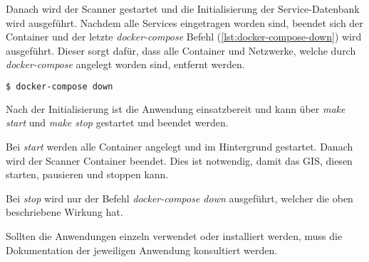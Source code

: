 Danach wird der Scanner gestartet und die Initialisierung der Service-Datenbank wird ausgeführt. Nachdem alle Services eingetragen worden sind, beendet sich der Container und der letzte \textit{docker-compose} Befehl (\ref{lst:docker-compose-down}) wird ausgeführt. Dieser sorgt dafür, dass alle Container und Netzwerke, welche durch \textit{docker-compose} angelegt worden sind, entfernt werden.

\begin{lstlisting}[language=bash, caption={Aufräumen mit docker-compose down (bash)}, captionpos=b, label={lst:docker-compose-down}]
$ docker-compose down
\end{lstlisting}

Nach der Initialisierung ist die Anwendung einsatzbereit und kann über \textit{make start} und \textit{make stop} gestartet und beendet werden.

Bei \textit{start} werden alle Container angelegt und im Hintergrund gestartet. Danach wird der Scanner Container beendet. Dies ist notwendig, damit das GIS, diesen starten, pausieren und stoppen kann.

Bei \textit{stop} wird nur der Befehl \textit{docker-compose down} ausgeführt, welcher die oben beschriebene Wirkung hat.

Sollten die Anwendungen einzeln verwendet oder installiert werden, muss die Dokumentation der jeweiligen Anwendung konsultiert werden.